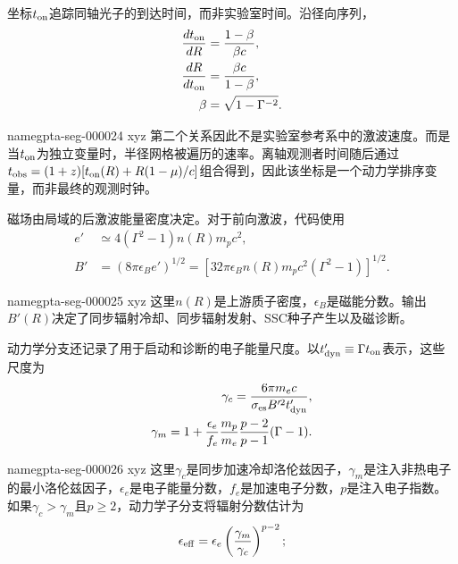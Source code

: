 \documentclass[twocolumn]{aastex702}
\makeatletter
\providecommand{\gptareaderanchor}[1]{\pdfdest name{#1} xyz}%
\providecommand{\gptareaderanchor}[1]{\special{pdf:dest (#1) [ @thispage /XYZ @xpos @ypos null ]}}%
\makeatother
\begin{document}
坐标\(t_{\rm on}\)追踪同轴光子的到达时间，而非实验室时间。沿径向序列，
\begin{equation}
\begin{aligned}
\frac{dt_{\rm on}}{dR} &= \frac{1-\beta}{\beta c},\\
\frac{dR}{dt_{\rm on}} &= \frac{\beta c}{1-\beta},\\
\beta &= \sqrt{1-\Gamma^{-2}}.
\end{aligned}
\end{equation}

\gptareaderanchor{gpta-seg-000024}%
第二个关系因此不是实验室参考系中的激波速度。而是当\(t_{\rm on}\)为独立变量时，半径网格被遍历的速率。离轴观测者时间随后通过\(t_{\rm obs}=(1+z)[t_{\rm on}(R)+R(1-\mu)/c]\)组合得到，因此该坐标是一个动力学排序变量，而非最终的观测时钟。

磁场由局域的后激波能量密度决定。对于前向激波，代码使用
\begin{equation}
\begin{aligned}
e' &\simeq4(\Gamma^2-1)n(R)m_pc^2,\\
B' &=\left(8\pi\epsilon_B e'\right)^{1/2}
=\left[32\pi\epsilon_B n(R)m_pc^2(\Gamma^2-1)\right]^{1/2}.
\end{aligned}
\end{equation}

\gptareaderanchor{gpta-seg-000025}%
这里\(n(R)\)是上游质子密度，\(\epsilon_B\)是磁能分数。输出\(B'(R)\)决定了同步辐射冷却、同步辐射发射、SSC种子产生以及磁诊断。

动力学分支还记录了用于启动和诊断的电子能量尺度。以\(t'_{\rm dyn}\equiv\Gamma t_{\rm on}\)表示，这些尺度为
\begin{equation}
\begin{aligned}
\gamma_c=
\frac{6\pi m_ec}{\sigma_{\rm es} B'^2t'_{\rm dyn}},
\\
\gamma_m=
1+\frac{\epsilon_e}{f_e}
\frac{m_p}{m_e}
\frac{p-2}{p-1}
(\Gamma-1).
\end{aligned}
\end{equation}

\gptareaderanchor{gpta-seg-000026}%
这里\(\gamma_c\)是同步加速冷却洛伦兹因子，\(\gamma_m\)是注入非热电子的最小洛伦兹因子，\(\epsilon_e\)是电子能量分数，\(f_e\)是加速电子分数，\(p\)是注入电子指数。如果\(\gamma_c>\gamma_m\)且\(p\ge2\)，动力学子分支将辐射分数估计为
\begin{equation}
\epsilon_{\rm eff}=\epsilon_e\left(\frac{\gamma_m}{\gamma_c}\right)^{p-2};
\end{equation}
\end{document}

